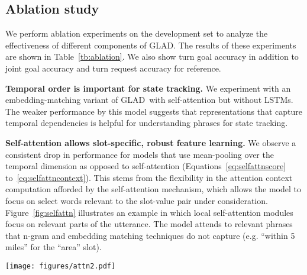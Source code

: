 \documentclass[11pt,a4paper]{article}
\newcommand{\modelnameshort}{GLAD}
\begin{document}
\subsection{Ablation study}





We perform ablation experiments on the development set to analyze the effectiveness of different components of \modelnameshort.
The results of these experiments are shown in Table~\ref{tb:ablation}.
We also show turn goal accuracy in addition to joint goal accuracy and turn request accuracy for reference.

\textbf{Temporal order is important for state tracking.}
We experiment with an embedding-matching variant of \modelnameshort~with self-attention but without LSTMs.
The weaker performance by this model suggests that representations that capture temporal dependencies is helpful for understanding phrases for state tracking.

\textbf{Self-attention allows slot-specific, robust feature learning.}
We observe a consistent drop in performance for models that use mean-pooling over the temporal dimension as opposed to self-attention (Equations~\eqref{eq:selfattnscore} to~\eqref{eq:selfattncontext}).
This stems from the flexibility in the attention context computation afforded by the self-attention mechanism, which allows the model to focus on select words relevant to the slot-value pair under consideration.
Figure~\ref{fig:selfattn} illustrates an example in which local self-attention modules focus on relevant parts of the utterance.
The model attends to relevant phrases that n-gram and embedding matching techniques do not capture (e.g. ``within 5 miles'' for the ``area'' slot).

\begin{figure*}[t]
\centering
\texttt{[image: figures/attn2.pdf]}
\caption{
Global and local self-attention scores on user utterances.
Each row corresponds to the self-attention score for a particular slot.
Slot-specific local self-attention modules emphasize relevant key words and phrases to that slot, whereas the global module attends to all relevant words.
}
\label{fig:selfattn}
\vspace{-0.2cm}
\end{figure*}
\end{document}
